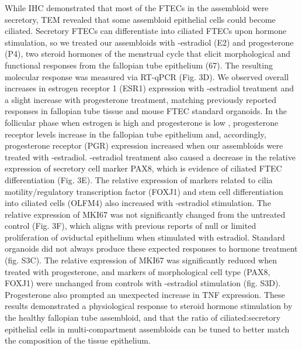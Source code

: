\begin{refsection}
    While IHC demonstrated that most of the FTECs in the assembloid were secretory, TEM revealed that some assembloid epithelial cells could become ciliated. Secretory FTECs can differentiate into ciliated FTECs upon hormone stimulation\cite{fitzgerald2019a,donnez1985a,comer1998a,comer1998a,garcia-alonso2021a}, so we treated our assembloids with \textbeta-estradiol (E2) and progesterone (P4), two steroid hormones of the menstrual cycle that elicit morphological and functional responses from the fallopian tube epithelium (67). The resulting molecular response was measured via RT-qPCR (Fig. 3D). We observed overall increases in estrogen receptor 1 (ESR1) expression with \textbeta-estradiol treatment and a slight increase with progesterone treatment, matching previously reported responses in fallopian tube tissue\cite{brodowska2021a} and mouse FTEC standard organoids\cite{xie2018a}. In the follicular phase when estrogen is high and progesterone is low \cite{monis-a}, progesterone receptor levels increase in the fallopian tube epithelium\cite{akison2012a} and, accordingly, progesterone receptor (PGR) expression increased when our assembloids were treated with \textbeta-estradiol. \textbeta-estradiol treatment also caused a decrease in the relative expression of secretory cell marker PAX8, which is evidence of ciliated FTEC differentiation (Fig. 3E). The relative expression of markers related to cilia motility/regulatory transcription factor (FOXJ1)\cite{yu2008a,turco2017a} and stem cell differentiation into ciliated cells (OLFM4)\cite{gu2020a,li2020a} also increased with \textbeta-estradiol stimulation. The relative expression of MKI67 was not significantly changed from the untreated control (Fig. 3F), which aligns with previous reports of null or limited proliferation of oviductal epithelium when stimulated with estradiol\cite{eddie2015a,moyle-heyrman2016a}. Standard organoids did not always produce these expected responses to hormone treatment (fig. S3C). The relative expression of MKI67 was significantly reduced when treated with progesterone, and markers of morphological cell type (PAX8, FOXJ1) were unchanged from controls with \textbeta-estradiol stimulation (fig. S3D). Progesterone also prompted an unexpected increase in TNF expression. These results demonstrated a physiological response to steroid hormone stimulation by the healthy fallopian tube assembloid, and that the ratio of ciliated:secretory epithelial cells in multi-compartment assembloids can be tuned to better match the composition of the tissue epithelium.

\end{refsection}
